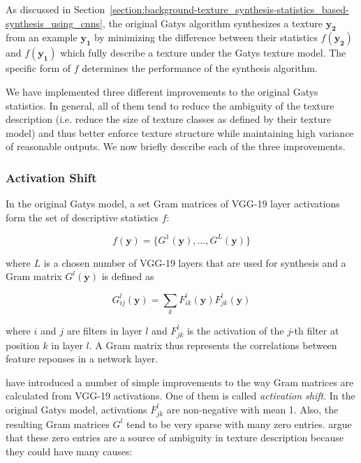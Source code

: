As discussed in Section~\ref{section:background-texture_synthesis-statistics_based-synthesis_using_cnns}, the original Gatys algorithm synthesizes a texture \(\bm{y_2}\) from an example \(\bm{y_1}\) by minimizing the difference between their statistics \(f(\bm{y_2})\) and \(f(\bm{y_1})\) which fully describe a texture under the Gatys texture model. The specific form of \(f\) determines the performance of the synthesis algorithm.

We have implemented three different improvements to the original Gatys statistics. In general, all of them tend to reduce the ambiguity of the texture description (i.e. reduce the size of texture classes as defined by their texture model) and thus better enforce texture structure while maintaining high variance of reasonable outputs. We now briefly describe each of the three improvements.

\subsubsection{Activation Shift}
\label{section:methods-texture_model-improvements-activation_shift}

In the original Gatys model, a set Gram matrices of VGG-19 layer activations form the set of descriptive statistics \(f\):

\begin{equation}
    \label{eq:gatys_statistics}
    f(\bm{y}) = \{G^1(\bm{y}), \dots, G^L(\bm{y})\}
\end{equation}

where \(L\) is a chosen number of VGG-19 layers that are used for synthesis and a Gram matrix \(G^l(\bm{y})\) is defined as

\begin{equation}
    \label{eq:gram_style}
    G_{ij}^l(\bm{y}) = \sum_k F_{ik}^l(\bm{y}) F_{jk}^l(\bm{y})
\end{equation}

where \(i\) and \(j\) are filters in layer \(l\) and \(F_{jk}^l\) is the activation of the \(j\)-th filter at position \(k\) in layer \(l\). A Gram matrix thus represents the correlations between feature reponses in a network layer.

\citet{Novak2016} have introduced a number of simple improvements to the way Gram matrices are calculated from VGG-19 activations. One of them is called \textit{activation shift}. In the original Gatys model, activations \(F_{jk}^l\) are non-negative with mean 1. Also, the resulting Gram matrices \(G^l\) tend to be very sparse with many zero entries. \citet{Novak2016} argue that these zero entries are a source of ambiguity in texture description because they could have many causes:

